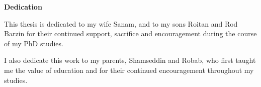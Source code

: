 
\begin{center}\textbf{Dedication}\end{center}

This thesis is dedicated to my wife Sanam, and to my sons Roitan and Rod Barzin for their continued support, sacrifice and encouragement during the course of my PhD studies. 

I also dedicate this work to my parents, Shamseddin and Robab, who first taught me the value of education and for their continued encouragement throughout my studies.


\cleardoublepage
